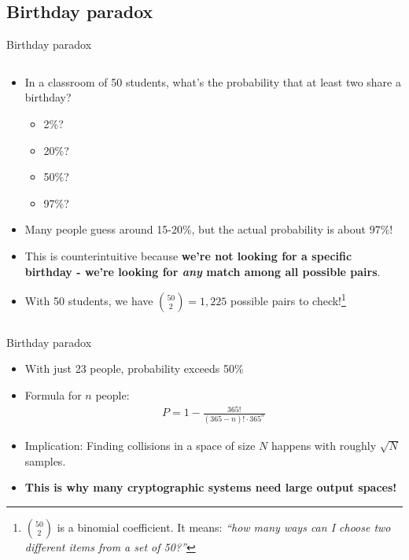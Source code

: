 \documentclass[aspectratio=169, lualatex, handout]{beamer}
\begin{document}
\subsection{Birthday paradox}

\begin{frame}{Birthday paradox}
	\begin{columns}[c]
		\begin{column}{1\textwidth}
			\begin{itemize}[<+->]
				\item In a classroom of 50 students, what's the probability that at least two share a birthday?
				      \begin{itemize}
					      \item 2\%?
					      \item 20\%?
					      \item 50\%?
					      \item 97\%?
				      \end{itemize}
				\item Many people guess around 15-20\%, but the actual probability is about 97\%!
				\item This is counterintuitive because \textbf{we're not looking for a specific birthday - we're looking for \textit{any} match among all possible pairs}.
				\item With 50 students, we have $\binom{50}{2} = 1,225$ possible pairs to check!\footnote{$\binom{50}{2}$ is a binomial coefficient. It means: \textit{``how many ways can I choose two different items from a set of 50?''}}
			\end{itemize}
		\end{column}
	\end{columns}
\end{frame}

\begin{frame}{Birthday paradox}
	\begin{itemize}
		\item With just 23 people, probability exceeds 50\%
		\item Formula for $n$ people:
		      \begin{align*}
			      P = 1 - \frac{365!}{(365-n)! \cdot 365^n}
		      \end{align*}
		\item Implication: Finding collisions in a space of size $N$ happens with roughly $\sqrt{N}$ samples.
		\item \textbf{This is why many cryptographic systems need large output spaces!}
	\end{itemize}
\end{frame}
\end{document}
